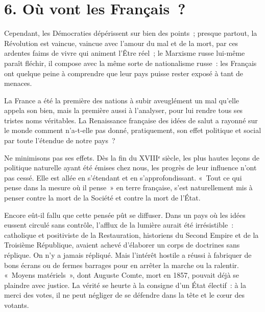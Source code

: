 \documentclass[french,twoside]{book} %
\begin{document}
\section[{6. Où vont les Français ?}]{6. Où vont les Français ?}
\noindent Cependant, les Démocraties dépérissent sur bien des points ; presque partout, la Révolution est vaincue, vaincue avec l’amour du mal et de la mort, par ces ardentes faims de vivre qui animent l’Être réel ; le Marxisme russe lui-même paraît fléchir, il compose avec la même sorte de nationalisme russe : les Français ont quelque peine à comprendre que leur pays puisse rester exposé à tant de menaces.\par
La France a été la première des nations à subir aveuglément un mal qu’elle appela son bien, mais la première aussi à l’analyser, pour lui rendre tous ses tristes noms véritables. La Renaissance française des idées de salut a rayonné sur le monde comment n’a-t-elle pas donné, pratiquement, son effet politique et social par toute l’étendue de notre pays ?\par
Ne minimisons pas ses effets. Dès la fin du XVIIIᵉ siècle, les plus hautes leçons de politique naturelle ayant été émises chez nous, les progrès de leur influence n’ont pas cessé. Elle est allée en s’étendant et en s’approfondissant. « Tout ce qui pense dans la mesure où il pense » en terre française, s’est naturellement mis à penser contre la mort de la Société et contre la mort de l’État.\par
Encore eût-il fallu que cette pensée pût se diffuser. Dans un pays où les idées eussent circulé sans contrôle, l’afflux de la lumière aurait été irrésistible : catholique et positiviste de la Restauration, historiens du Second Empire et de la Troisième République, avaient achevé d’élaborer un corps de doctrines sans réplique. On n’y a jamais répliqué. Mais l’intérêt hostile a réussi à fabriquer de bons écrans ou de fermes barrages pour en arrêter la marche ou la ralentir. « Moyens matériels », dont Auguste Comte, mort en 1857, pouvait déjà se plaindre avec justice. La vérité se heurte à la consigne d’un État électif : à la merci des votes, il ne peut négliger de se défendre dans la tête et le cœur des votants.\par
\end{document}
